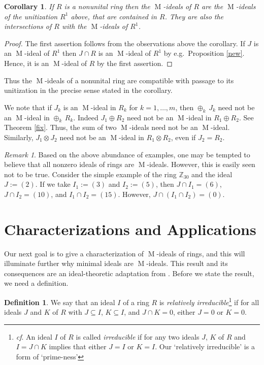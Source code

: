\documentclass[11pt,leqno]{amsart}
\DeclareMathOperator{\m}{M}
\newtheorem{corollary}[theorem]{Corollary}
\theoremstyle{definition}
\newtheorem{definition}{Definition}[section]
\theoremstyle{remark}
\newtheorem{remark}[theorem]{Remark}
\numberwithin{equation}{section}
\numberwithin{equation}{section}
\begin{document}
\begin{corollary}
\label{uni} 
If $R$ is a nonunital ring then the $\m$-ideals of $R$ are the  $\m$-ideals of  the unitization $R^1$ above, 
that are contained in $R$.  They are also the intersections of $R$ with 
the  $\m$-ideals of  $R^1$.
\end{corollary}

\begin{proof}  The first assertion follows from 
the observations above the corollary.  If $J$ is
an $\m$-ideal of  $R^1$ then $J \cap R$ is an $\m$-ideal of $R^1$ by e.g.\
Proposition \ref{new}. 
Hence, it is an $\m$-ideal of $R$ by the first 
assertion. 
\end{proof}

Thus the $\m$-ideals of a nonunital ring are compatible with passage to its unitization in the precise sense stated in the corollary. 

We note that if $J_k$ is an $\m$-ideal in $R_k$ for $k = 1, \ldots, m$, then $\oplus_k \, J_k$ need not be an $\m$-ideal in $\oplus_k \, R_k$.  Indeed $J_1 \oplus R_2$ need not be an $\m$-ideal in $R_1 \oplus R_2$.  See Theorem \ref{fix}.  Thus, the sum of two $\m$-ideals need not be an $\m$-ideal.  
Similarly, $J_1 \otimes J_2$ need not be an $\m$-ideal in $R_1 \otimes R_2$, even if $J_2 = R_2$.  


\begin{remark}
Based on the above abundance of examples, one may be tempted to believe that all nonzero ideals of rings are $\m$-ideals. However, this is easily seen not to be true. Consider the simple example of the ring $\mathds{Z}_{30}$ and the ideal $J:= (2)$. If we take $I_1:= (3)$ and $I_2:=  (5)$, then $J\cap I_1= (6)$, $J\cap I_2= (10)$, and $I_1\cap I_2= (15)$. However, $J\cap (I_1\cap I_2)=(0)$.    
\end{remark}

\section{Characterizations and Applications}

Our next goal is to give a characterization of $\m$-ideals of rings, and this will illuminate further why minimal ideals are $\m$-ideals. This result and its consequences are an ideal-theoretic adaptation from \cite{GCM25}. Before we state the result, we need a definition.

\begin{definition}
We say that an ideal $I$ of a ring $R$ is \emph{relatively irreducible}\footnote{\textit{cf}. An ideal $I$ of $R$ is called \emph{irreducible} if for any two ideals $J$, $K$ of $R$ and $I=J\cap K$ implies that either $J=I$ or $K=I$.  Our `relatively irreducible' is a form of `prime-ness'} if for  all  
ideals $J$ and $K$ of $R$ with $J\subseteq I$, $K\subseteq I$, and $J\cap K=0$,   either $J=0$ or $K=0$. 
\end{definition}
\end{document}
